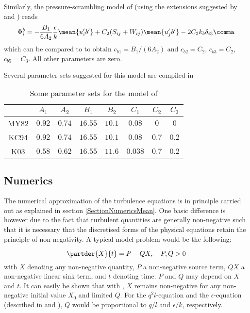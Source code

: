 Similarly, the pressure-scrambling model of \cite{MellorYamada82} (using 
the extensions suggested by \cite{KanthaClayson94} and \cite{Kantha2003}) 
reads
\begin{equation}
  \label{PhibMY82}
   \Phi^b_i = - \dfrac{B_1}{6 A_2} \dfrac{\epsilon}{k} \mean{u'_i b'} 
    + C_2 ( S_{ij} + W_{ij} )  \mean{u'_j b'} - 2 C_3 k_b \delta_{i3}
    \comma
\end{equation}
which can be compared to  to obtain $c_{b1} = B_1 / (6 A_2)$ and
$c_{b2} = C_2$, $c_{b3} = C_2$, $c_{b5} = C_3$. 
All other parameters are zero.

Several parameter sets suggested for this model are compiled in 
\begin{table}[!h]
 \begin{tabular}{c|ccccccc}                                                   
      &  $A_1$   &  $A_2$  &  $B_1$  & $B_2$   &   $C_1$  &  $C_2$  &  $C_3$  \\ \hline  
MY82  & $0.92$   & $0.74$  & $16.55$ & $10.1$  &  $0.08$  & $0$     & $0$     \\ 
KC94  & $0.92$   & $0.74$  & $16.55$ & $10.1$  &  $0.08$  & $0.7$   & $0.2$   \\ 
K03   & $0.58$   & $0.62$  & $16.55$ & $11.6$  &  $0.038$ & $0.7$   & $0.2$     
 \end{tabular}
 \caption{\label{tab:MY}Some parameter sets for the model of \cite{MellorYamada82}}
\end{table}


\subsection{Numerics}

The numerical approximation of the turbulence equations is in principle
carried out as explained in section \ref{SectionNumericsMean}. 
One basic difference is however due to the fact that turbulent
quantities are generally non-negative such that
it is necessary that the discretised forms of the physical
equations retain the principle of non-negativity. 
A typical model problem would be the following:

\begin{equation}
 \label{eq:burchard11}
 \partder{X}{t} =P-QX, \quad P,Q > 0
\end{equation}
with $X$ denoting any non-negative quantity, $P$ a non-negative
source term, $QX$ a non-negative linear sink term, and $t$ denoting
time. $P$ and $Q$ may depend on $X$ and $t$. It can easily be shown
that with , $X$ remains non-negative for any
non-negative initial value $X_0$ and limited $Q$.  For the $q^2
l$-equation and the $\epsilon$-equation (described in
 and ), 
$Q$ would be proportional to $q/l$ and $\epsilon
/k$, respectively.

